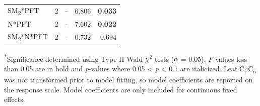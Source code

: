 \begin{table}
\begin{tabular}{p{6cm}p{0.5cm}p{2cm}p{1.5cm}p{1.5cm}}
            SM\textsubscript{2}*PFT
            & \multicolumn{1}{r}{2}
            & \multicolumn{1}{r}{-}
            & \multicolumn{1}{r}{6.806}
            & \multicolumn{1}{r}{\textbf{0.033}}
            \\

            N*PFT
            & \multicolumn{1}{r}{2}
            & \multicolumn{1}{r}{-}
            & \multicolumn{1}{r}{7.602}
            & \multicolumn{1}{r}{\textbf{0.022}}
            \\

            SM\textsubscript{2}*N*PFT
            & \multicolumn{1}{r}{2}
            & \multicolumn{1}{r}{-}
            & \multicolumn{1}{r}{0.732}
            & \multicolumn{1}{r}{0.694}
            \\
            \hline
        \end{tabular}%
    \label{tab:table4.3}
\end{table}
\noindent \textsuperscript{$*$}Significance determined using Type II Wald $\chi^{2}$ tests ($\alpha$ = 0.05). \textit{P}-values less than 0.05 are in bold and \textit{p}-values where 0.05 < \textit{p} < 0.1 are italicized. Leaf C\textsubscript{i}:C\textsubscript{a} was not transformed prior to model fitting, so model coefficients are reported on the response scale. Model coefficients are only included for continuous fixed effects.
\clearpage

